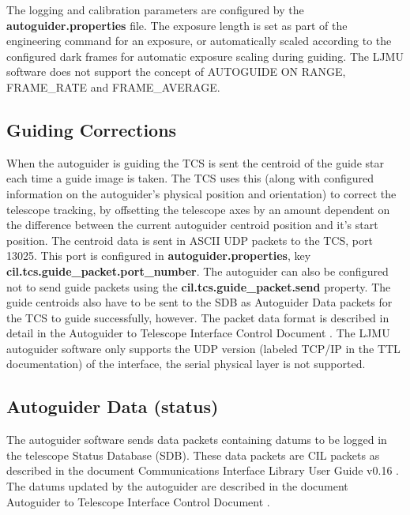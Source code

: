 \documentclass[10pt,a4paper]{article}
\begin{document}
The logging and calibration parameters are configured by the {\bf autoguider.properties} file. The exposure length is set as part of the engineering command for an exposure, or automatically scaled according to the configured dark frames for automatic exposure scaling during guiding. The LJMU software does not support the concept of AUTOGUIDE ON RANGE, FRAME\_RATE and FRAME\_AVERAGE. 

\subsection{Guiding Corrections}

When the autoguider is guiding the TCS is sent the centroid of the guide star each time a guide image is taken. The TCS
uses this (along with configured information on the autoguider's physical position and orientation) to correct the
telescope tracking, by offsetting the telescope axes by an amount dependent on the difference between the current autoguider centroid position and it's start position. The centroid data is sent in ASCII UDP packets to the TCS, port 13025. This port is configured in
{\bf autoguider.properties}, key {\bf cil.tcs.guide\_packet.port\_number}. The autoguider can also be configured not to
send guide packets using the {\bf cil.tcs.guide\_packet.send} property. The guide centroids also have to be sent to the SDB as Autoguider Data packets for the TCS to guide successfully, however. The packet data format is described in detail in the Autoguider to Telescope Interface Control Document \cite{bib:agtcsicd}. The LJMU autoguider software only supports the UDP version (labeled TCP/IP in the TTL documentation) of the interface, the serial physical layer is not supported.

\subsection{Autoguider Data (status)}

The autoguider software sends data packets containing datums to be logged in the telescope Status Database (SDB).
These data packets are CIL packets as described in the document Communications Interface Library User Guide v0.16  \cite{bib:ciluserguide}. The datums updated by the autoguider are described in the document Autoguider to Telescope Interface Control Document \cite{bib:agtcsicd}.
\end{document}
